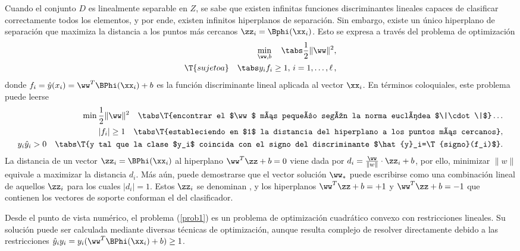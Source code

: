 Cuando el conjunto $D$ es linealmente separable en $Z$, se sabe que
existen infinitas funciones discriminantes lineales capaces de
clasificar correctamente todos los elementos, y por ende, existen
infinitos hiperplanos de separación.  Sin embargo, existe un único
hiperplano de separación  que maximiza la distancia a los
puntos más cercanos $\zz_i=\Bphi(\xx_i)$.  Esto se expresa a través del
problema de optimización
%
\begin{align}
  \begin{split}
    \min_{\ww,b} \quad\tabs \frac{1}{2}\|\ww\|^2, \\
    \T{sujeto a}\quad\tabs y_i f_i\geq1,\,i=1,\ldots,\ell\,, 
  \end{split}
  \label{prob1}
\end{align}
%
donde $f_i=\hat{y}(x_i)=\ww^T\BPhi(\xx_i)+b$ es la función
discriminante lineal aplicada al vector $\xx_i$. En términos
coloquiales, este problema puede leerse
%
\begin{align*}
  \begin{split}
    \min \frac{1}{2}\|\ww\|^2 \quad \tabs \T{encontrar el $\ww$ más
      pequeño según la norma euclídea $\|\cdot\|$}\ldots\\
    |f_i|\geq1 \quad \tabs \T{estableciendo en $1$ la distancia del
      hiperplano a los puntos más cercanos},\\
    y_i\hat{y}_i>0\quad \tabs \T{y tal que la clase $y_i$ coincida con el
      signo del discriminante $\hat{y}_i=\T{signo}(f_i)$}.
  \end{split}
\end{align*}
%
La distancia de un vector $\zz_i=\BPhi(\xx_i)$ al hiperplano
$\ww^T\zz+b=0$ viene dada por $d_i=\frac{\ww}{\|w\|}\cdot\zz_i+b$, por
ello, minimizar $\|w\|$ equivale a maximizar la distancia $d_i$.
Más aún, puede demostrarse que el vector solución $\ww_*$ puede escribirse como
una combinación lineal de aquellos $\zz_i$ para los cuales $|d_i|=1$.
Estos $\zz_i$ se denominan , y los hiperplanos
$\ww^T\zz+b=+1$ y $\ww^T\zz+b=-1$ que contienen los vectores de soporte
conforman el  del clasificador.

Desde el punto de vista numérico, el problema (\ref{prob1}) es un
problema de optimización cuadrático convexo con restricciones
lineales. Su solución puede ser calculada mediante diversas técnicas
de optimización, aunque resulta complejo de resolver directamente
debido a las restricciones
$\hat{y}_i{y}_i={y}_i(\ww^T\BPhi(\xx_i)+b)\geq{}1$.

